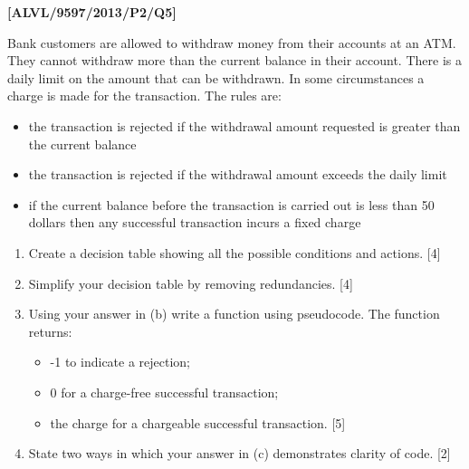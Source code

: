 \item \textbf{{[}ALVL/9597/2013/P2/Q5{]} }

Bank customers are allowed to withdraw money from their accounts at
an ATM. They cannot withdraw more than the current balance in their
account. There is a daily limit on the amount that can be withdrawn.
In some circumstances a charge is made for the transaction. The rules
are:
\begin{itemize}
\item the transaction is rejected if the withdrawal amount requested is
greater than the current balance 
\item the transaction is rejected if the withdrawal amount exceeds the daily
limit 
\item if the current balance before the transaction is carried out is less
than 50 dollars then any successful transaction incurs a fixed charge
\end{itemize}
\begin{enumerate}
\item Create a decision table showing all the possible conditions and actions.
\hfill{}{[}4{]}
\item Simplify your decision table by removing redundancies. \hfill{}{[}4{]}
\item Using your answer in (b) write a function using pseudocode. The function
returns:
\begin{itemize}
\item -1 to indicate a rejection; 
\item 0 for a charge-free successful transaction; 
\item the charge for a chargeable successful transaction.\hfill{} {[}5{]}
\end{itemize}
\item State two ways in which your answer in (c) demonstrates clarity of
code. \hfill{}{[}2{]}
\end{enumerate}
